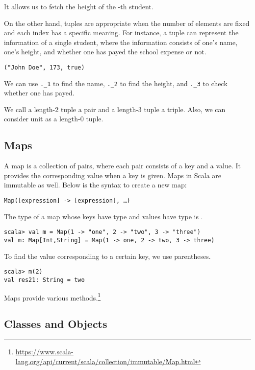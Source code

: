 It allows us to fetch the height of the -th student.

On the other hand, tuples are appropriate when the number of elements
are fixed and each index has a specific meaning. For instance,
a tuple can represent the information of a single student, where the information
consists of one's name, one's height, and whether one has payed the school
expense or not.

\begin{verbatim}
("John Doe", 173, true)
\end{verbatim}

We can use \verb+._1+ to find the name, \verb+._2+ to find the height, and
\verb+._3+ to check whether one has payed.

We call a length-2 tuple a pair and a length-3 tuple a triple. Also, we can
consider unit as a length-0 tuple.

\subsection{Maps}

A map is a collection of pairs, where each pair consists of a key and a value.
It provides the corresponding value when a key is given.
Maps in Scala are immutable as well. Below is the syntax to create a new map:

\begin{verbatim}
Map([expression] -> [expression], …)
\end{verbatim}

The type of a map whose keys have type  and values have type  is
.

\begin{verbatim}
scala> val m = Map(1 -> "one", 2 -> "two", 3 -> "three")
val m: Map[Int,String] = Map(1 -> one, 2 -> two, 3 -> three)
\end{verbatim}

To find the value corresponding to a certain key, we use parentheses.

\begin{verbatim}
scala> m(2)
val res21: String = two
\end{verbatim}

Maps provide various
methods.\footnote{\url{https://www.scala-lang.org/api/current/scala/collection/immutable/Map.html}}

\subsection{Classes and Objects}

